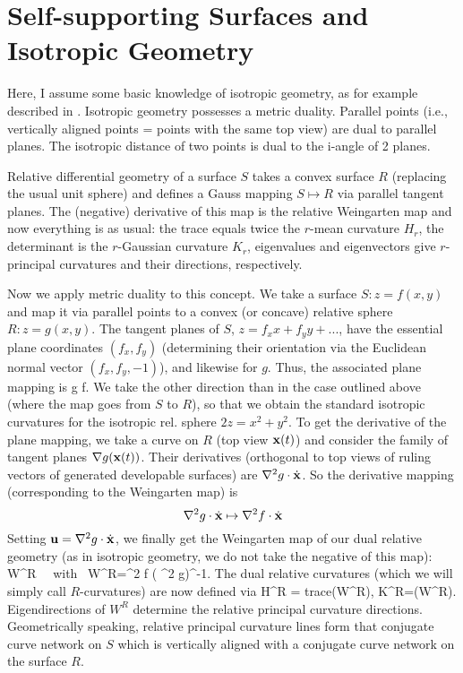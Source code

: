 \documentclass[annual]{acmsiggraph}
\begin{document}
\section{Self-supporting Surfaces and Isotropic Geometry} \label{sec:smooth}


Here, I assume some basic knowledge of isotropic geometry, as for example described in
\cite{Pottmann2007}. Isotropic geometry possesses a metric duality. Parallel points (i.e., vertically
aligned points = points with the same top view) are dual to parallel planes. The isotropic distance
of two points is dual to the i-angle of 2 planes. 

Relative differential geometry of a surface $S$ takes a convex surface $R$ (replacing the usual unit sphere) and
defines a Gauss mapping $S \mapsto R$ via parallel tangent planes. The (negative) derivative of this
map is the relative Weingarten map and now everything is as usual: the trace equals twice the
 $r$-mean curvature $H_r$, the determinant
is the $r$-Gaussian curvature $K_r$, eigenvalues and eigenvectors give $r$-principal curvatures and
their directions, respectively.

Now we apply metric duality to this concept. We take a surface $S: z=f(x,y)$ and map it via parallel
points to a convex (or concave) relative sphere $R: z=g(x,y)$. The tangent planes of $S$, $z=f_x x+f_y y+ ...$, have
the essential plane coordinates $(f_x,f_y)$ (determining their orientation via the Euclidean normal vector $(f_x,f_y,-1)$), and likewise for $g$. Thus, the associated plane
mapping is
%
\be \nabla g \mapsto \nabla f. \ee
%
We take the other direction than in the case outlined above (where the map goes from $S$ to $R$), so that we obtain the standard isotropic curvatures for the isotropic rel. sphere $2z=x^2+y^2$.
To get the derivative of the plane mapping, we take a curve on $R$ (top view ${\mathbf x}(t)$) and consider the family of tangent
planes $\nabla g({\mathbf x}(t))$. Their derivatives (orthogonal to top views of ruling vectors of generated developable
surfaces) are $\nabla^2 g  \cdot \dot{{\mathbf x}}$. So the derivative mapping (corresponding to the Weingarten
map) is 
%
$$ \nabla^2g \cdot \dot{{\mathbf x}} \mapsto \nabla^2f \cdot \dot{{\mathbf x}}$$
%
Setting ${\mathbf u}=\nabla^2g \cdot \dot{{\mathbf x}}$, we finally get the Weingarten map of our dual relative geometry (as
in isotropic geometry, we do not take the negative of this map):
%
\be \uw \mapsto W^R \cdot \uw \ \ {\rm with} \ W^R=\nabla^2 f \cdot ( \nabla^2 g)^{-1}. \ee
%
The dual relative curvatures (which we will simply call $R$-curvatures) are now defined via
%
 H^R = {\rm trace}(W^R), K^R=\det(W^R). \ee
%
Eigendirections of $W^R$ determine the relative principal curvature directions. Geometrically speaking, relative principal curvature
lines form that conjugate curve network on $S$ which is vertically aligned with a conjugate
curve network on the surface $R$. 
\end{document}
